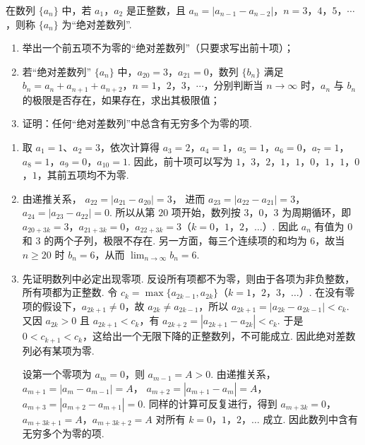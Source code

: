 \begin{problem}
在数列 \(\{a_n\}\) 中，若 \(a_1\)，\(a_2\) 是正整数，且 \(a_n=\left|a_{n-1}-a_{n-2}\right|\)，\(n=3\)，\(4\)，\(5\)，\(\cdots\)，则称 \(\{a_n\}\) 为“绝对差数列”.

\begin{enumerate}
\item 举出一个前五项不为零的“绝对差数列”（只要求写出前十项）；
\item 若“绝对差数列” \(\{a_n\}\) 中，\(a_{20}=3\)，\(a_{21}=0\)，数列 \(\{b_n\}\) 满足 \(b_n=a_n+a_{n+1}+a_{n+2}\)，\(n=1\)，\(2\)，\(3\)，\(\cdots\)，分别判断当 \(n\to\infty\) 时，\(a_n\) 与 \(b_n\) 的极限是否存在，如果存在，求出其极限值；
\item 证明：任何“绝对差数列”中总含有无穷多个为零的项.
\end{enumerate}
\end{problem}

\begin{solution}
\begin{enumerate}
\item 取 \(a_1=1\)、\(a_2=3\)，依次计算得
\(a_3=2\)，\(a_4=1\)，\(a_5=1\)，\(a_6=0\)，\(a_7=1\)，\(a_8=1\)，\(a_9=0\)，\(a_{10}=1\).
因此，前十项可以写为 \(1\)，\(3\)，\(2\)，\(1\)，\(1\)，\(0\)，\(1\)，\(1\)，\(0\)，\(1\)，其前五项均不为零.
\item 由递推关系，
\(a_{22}=|a_{21}-a_{20}|=3\)，
进而
\(a_{23}=|a_{22}-a_{21}|=3\)，\(a_{24}=|a_{23}-a_{22}|=0\).
所以从第 \(20\) 项开始，数列按 \(3\)，\(0\)，\(3\) 为周期循环，即
\(a_{20+3k}=3\)，\(a_{21+3k}=0\)，\(a_{22+3k}=3\)（\(k=0\)，\(1\)，\(2\)，\(\ldots\)）.
因此 \(a_n\) 有值为 \(0\) 和 \(3\) 的两个子列，极限不存在. 另一方面，每三个连续项的和均为 \(6\)，故当 \(n\geqslant20\) 时 \(b_n=6\)，从而
\(\displaystyle\lim_{n\to\infty}b_n=6\).
\item 先证明数列中必定出现零项. 反设所有项都不为零，则由于各项为非负整数，所有项都为正整数. 令
\(c_k=\max\{a_{2k-1},a_{2k}\}\)（\(k=1\)，\(2\)，\(3\)，\(\ldots\)）.
在没有零项的假设下，\(a_{2k+1}\ne0\)，故 \(a_{2k}\ne a_{2k-1}\)，所以
\(a_{2k+1}=|a_{2k}-a_{2k-1}|<c_k\).
又因 \(a_{2k}>0\) 且 \(a_{2k+1}<c_k\)，有
\(a_{2k+2}=|a_{2k+1}-a_{2k}|<c_k\).
于是 \(0<c_{k+1}<c_k\)，这给出一个无限下降的正整数列，不可能成立. 因此绝对差数列必有某项为零.

设第一个零项为 \(a_m=0\)，则 \(a_{m-1}=A>0\). 由递推关系，
\(a_{m+1}=|a_m-a_{m-1}|=A\)，
\(a_{m+2}=|a_{m+1}-a_m|=A\)，
\(a_{m+3}=|a_{m+2}-a_{m+1}|=0\).
同样的计算可反复进行，得到
\(a_{m+3k}=0\)，\(a_{m+3k+1}=A\)，\(a_{m+3k+2}=A\)
对所有 \(k=0\)，\(1\)，\(2\)，\(\ldots\) 成立. 因此数列中含有无穷多个为零的项.
\end{enumerate}
\end{solution}
